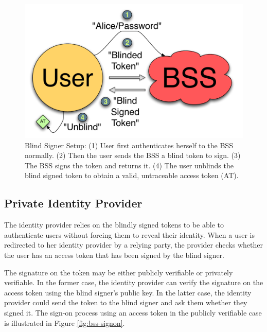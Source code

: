 \documentclass{llncs}
\begin{document}
\begin{figure}
  \centering
  \includegraphics[scale=0.6]{figs/fig-bss-setup-color.pdf}
  \caption{Blind Signer Setup: (1) User first authenticates herself to the BSS
  normally. (2) Then the user sends the BSS a blind token to sign. (3) The BSS
  signs the token and returns it. (4) The user unblinds the blind signed token
  to obtain a valid, untraceable access token (AT).}
  \label{fig:bss-setup}
\end{figure}

\subsection{Private Identity Provider}

The identity provider relies on the blindly signed tokens to be able
to authenticate users without forcing them to reveal their
identity. When a user is redirected to her identity provider by a
relying party, the provider checks whether the user has an access
token that has been signed by the blind signer.

The signature on the token may be either publicly verifiable or
privately verifiable. In the former case, the identity provider can
verify the signature on the access token using the blind signer's
public key. In the latter case, the identity provider could send the
token to the blind signer and ask them whether they signed it. The
sign-on process using an access token in the publicly verifiable case
is illustrated in Figure \ref{fig:bss-signon}.
\end{document}
